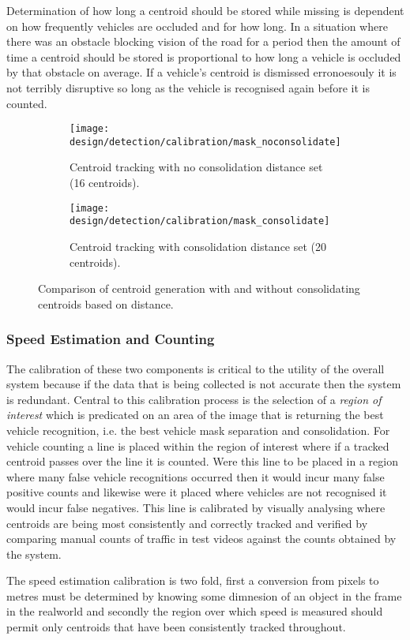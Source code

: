   Determination of how long a centroid should be stored while missing is dependent on how frequently vehicles are occluded and for how long. In a situation where there was an obstacle blocking vision of the road for a period then the amount of time a centroid should be stored is proportional to how long a vehicle is occluded by that obstacle on average. If a vehicle's centroid is dismissed erronoesouly it is not terribly disruptive so long as the vehicle is recognised again before it is counted. 

  \begin{figure}[H]
	\centering
	\begin{subfigure}[b]{0.45\linewidth}
              \centering\texttt{[image: design/detection/calibration/mask\_noconsolidate]}
              \captionsetup{format=hang}
              \caption{Centroid tracking with no consolidation distance set (16 centroids).}
              \label{fig:consolidateA}
		\label{fig:}
    	\end{subfigure}
    	\begin{subfigure}[b]{0.45\linewidth}
              \centering\texttt{[image: design/detection/calibration/mask\_consolidate]}
              \captionsetup{format=hang}
      		\caption{Centroid tracking with consolidation distance set (20 centroids).}
       		\label{fig:consolidateB}
        \end{subfigure}
        \captionsetup{format=hang}
    	\caption{Comparison of centroid generation with and without consolidating centroids based on distance.}
    	\label{fig:centroids_consolidation}
\end{figure}

\subsubsection{Speed Estimation and Counting}

The calibration of these two components is critical to the utility of the overall system because if the data that is being collected is not accurate then the system is redundant. Central to this calibration process is the selection of a \emph{region of interest} which is predicated on an area of the image that is returning the best vehicle recognition, i.e. the best vehicle mask separation and consolidation. For vehicle counting a line is placed within the region of interest where if a tracked centroid passes over the line it is counted. Were this line to be placed in a region where many false vehicle recognitions occurred then it would incur many false positive counts and likewise were it placed where vehicles are not recognised it would incur false negatives. This line is calibrated by visually analysing where centroids are being most consistently and correctly tracked and verified by comparing manual counts of traffic in test videos against the counts obtained by the system. 

The speed estimation calibration is two fold, first a conversion from pixels to metres must be determined by knowing some dimnesion of an object in the frame in the realworld and secondly the region over which speed is measured should permit only centroids that have been consistently tracked throughout. 

  
